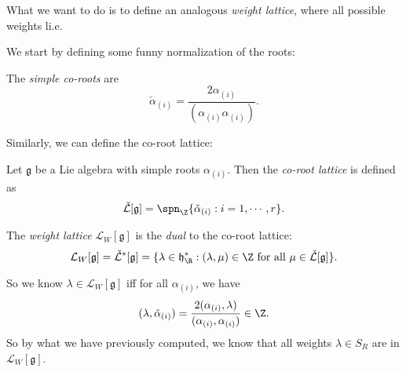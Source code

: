 \documentclass[a4paper]{article}
\begin{document}
What we want to do is to define an analogous \emph{weight lattice}, where all possible weights li.e.

We start by defining some funny normalization of the roots:
\begin{defi}
  The \emph{simple co-roots} are
  \[
    \check{\alpha}_{(i)} = \frac{2 \alpha_{(i)}}{(\alpha_{(i)}\alpha_{(i)})}.
  \]
\end{defi}
Similarly, we can define the co-root lattice:

\begin{defi}
  Let $\mathfrak{g}$ be a Lie algebra with simple roots $\alpha_{(i)}$. Then the \emph{co-root lattice} is defined as
  \[
    \check{\mathcal{L}}[\mathfrak{g}] = \spn_\Z\{\check\alpha_{(i)}: i = 1, \cdots, r\}.
  \]
\end{defi}

\begin{defi}
  The \emph{weight lattice} $\mathcal{L}_W[\mathfrak{g}]$ is the \emph{dual} to the co-root lattice:
  \[
    \mathcal{L}_W [\mathfrak{g}] = \check{\mathcal{L}}^*[\mathfrak{g}] = \{\lambda \in \mathfrak{h}^*_\R: (\lambda, \mu) \in \Z \text{ for all }\mu \in \check{\mathcal{L}}[\mathfrak{g}]\}.
  \]
\end{defi}
So we know $\lambda \in \mathcal{L}_W[\mathfrak{g}]$ iff for all $\alpha_{(i)}$, we have
\[
  (\lambda , \check{\alpha}_{(i)}) = \frac{2(\alpha_{(i)}, \lambda)}{(\alpha_{(i)}, \alpha_{(i)})} \in \Z.
\]
So by what we have previously computed, we know that all weights $\lambda \in S_R$ are in $\mathcal{L}_W [\mathfrak{g}]$.
\end{document}
